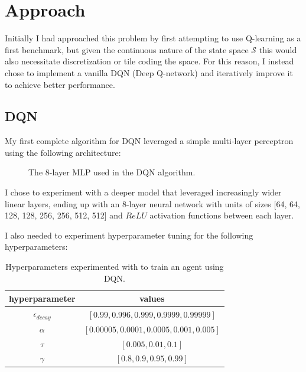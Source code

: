 \documentclass[11pt]{article}
\begin{document}
\section{Approach}

Initially I had approached this problem by first attempting to use Q-learning as
a first benchmark, but given the continuous nature of the state space
$\mathcal{S}$ this would also necessitate discretization or tile coding the
space. For this reason, I instead chose to implement a vanilla DQN (Deep
Q-network) and iteratively improve it to achieve better performance.

\subsection{DQN}

My first complete algorithm for DQN leveraged a simple multi-layer perceptron
using the following architecture:

\FloatBarrier

\begin{figure}[!ht]
    \centering
    \caption{The 8-layer MLP used in the DQN algorithm.}
    \label{fig:dqn-architecture}
\end{figure}

\FloatBarrier

I chose to experiment with a deeper model that leveraged increasingly wider linear layers,
 ending up with an 8-layer neural network with units of sizes [64, 64, 128, 128, 
 256, 256, 512, 512] and $ReLU$ activation functions between each layer.

I also needed to experiment hyperparameter tuning for the following 
hyperparameters:

\FloatBarrier

\begin{table}[!ht]
	\centering
	\begin{tabular}{ c | c }
	\textbf{hyperparameter} & \textbf{values} \\
	\hline
	$\epsilon_{decay}$ & $[0.99, 0.996, 0.999, 0.9999, 0.99999]$ \\
	$\alpha$ & $[0.00005, 0.0001, 0.0005, 0.001, 0.005]$ \\
	$\tau$ & $[0.005, 0.01, 0.1]$ \\
	$\gamma$ & $[0.8, 0.9, 0.95, 0.99]$ \\
	\hline
	\end{tabular}
	\caption{Hyperparameters experimented with to train an agent using DQN.}
	\label{tbl:hyperparameters}
\end{table}
\end{document}
